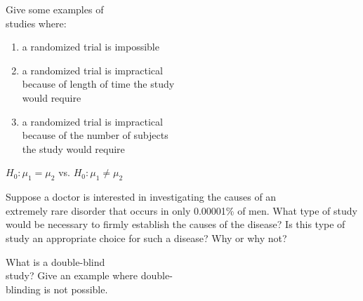 \documentclass[11pt, chapterprefix=true]{scrbook}\usepackage[]{graphicx}\usepackage[]{color}
\begin{document}
\begin{exercises}

  \begin{exercise} %

Give some examples of \\ studies where:

\begin{enumerate}
\item a randomized trial is impossible
\item a randomized trial is impractical \\ because of length of time the study      \\ would require
\item a randomized trial is impractical \\ because of the number of subjects \\ the study would require
\end{enumerate}


	\end{exercise}
	\begin{solution}  %

	  $H_0: \mu_1 = \mu_2$ vs. $H_0: \mu_1 \neq \mu_2$
	\end{solution}

  \begin{exercise} %

Suppose a doctor is interested in investigating the causes of an \\ extremely rare disorder that occurs in only 0.00001\% of men.  What type of study would be necessary to firmly establish the causes of the disease?  Is this type of study an appropriate choice for such a disease?  Why or why not?

	\end{exercise}
%

  \begin{exercise} %

What is a double-blind \\ study?  Give an example where double- \\ blinding is not possible.


\end{exercise}
\end{exercises}
\end{document}
